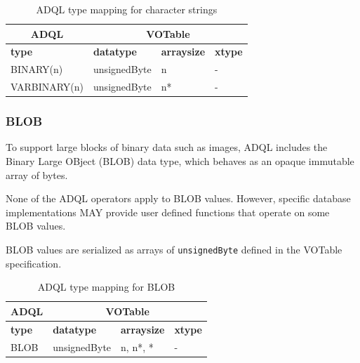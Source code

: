 \documentclass[11pt,a4paper]{ivoa}
\newcommand{\VOTspec}  {VOTable specification\xspace}
\begin{document}
\begin{table}[thm]\footnotesize
    \begin{tabular}
        {|p{}|p{}|p{}|p{}|}
        \hline

        \hline
        \multicolumn{1}{|c|}{\textbf{ADQL}} &
        \multicolumn{3}{|c|}{\textbf{VOTable}}
        \tabularnewline
        
        \hline
        \textbf{type} &
        \textbf{datatype} &
        \textbf{arraysize} &
        \textbf{xtype}
        \tabularnewline

        \hline
        BINARY(n) &
        unsignedByte &
        n &
        -
        \tabularnewline

        \hline
        VARBINARY(n) &
        unsignedByte &
        n* &
        -
        \tabularnewline

        \hline
    \end{tabular}
    \caption{ADQL type mapping for character strings}
    \label{table:types.binary.primitive}
\end{table}

\subsubsection{BLOB}
\label{sec:types.binary.blob}

To support large blocks of binary data such as images,
ADQL includes the Binary Large OBject (BLOB) data type,
which behaves as an opaque immutable array of bytes.

None of the ADQL operators apply to BLOB values.
However, specific database implementations MAY provide user
defined functions that operate on some BLOB values.

BLOB values are serialized as arrays of \verb:unsignedByte: defined
in the \VOTspec.

\begin{table}[thm]\footnotesize
    \begin{tabular}
        {|p{}|p{}|p{}|p{}|}
        \hline

        \hline
        \multicolumn{1}{|c|}{\textbf{ADQL}} &
        \multicolumn{3}{|c|}{\textbf{VOTable}}
        \tabularnewline
        
        \hline
        \textbf{type} &
        \textbf{datatype} &
        \textbf{arraysize} &
        \textbf{xtype}
        \tabularnewline

        \hline
        BLOB &
        unsignedByte  &
        n, n*, * &
        -
        \tabularnewline

        \hline
    \end{tabular}
    \caption{ADQL type mapping for BLOB}
    \label{table:types.binary.blob}
\end{table}
\end{document}
